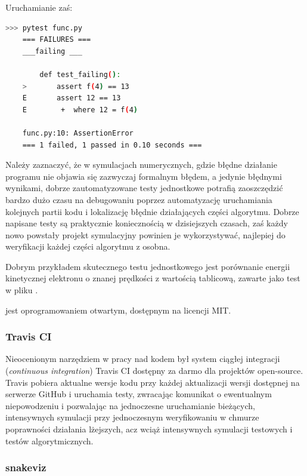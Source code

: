 

Uruchamianie zaś:

\begin{lstlisting}[language=Bash]
    >>> pytest func.py
    === FAILURES ===
    ___failing ___

        def test_failing():
    >       assert f(4) == 13
    E       assert 12 == 13
    E        +  where 12 = f(4)

    func.py:10: AssertionError
    === 1 failed, 1 passed in 0.10 seconds ===
\end{lstlisting}

Należy zaznaczyć, że w symulacjach numerycznych, gdzie błędne działanie programu nie
objawia się zazwyczaj formalnym błędem, a jedynie błędnymi
wynikami, dobrze zautomatyzowane testy jednostkowe potrafią zaoszczędzić
bardzo dużo czasu na debugowaniu poprzez automatyzację uruchamiania
kolejnych partii kodu i lokalizację błędnie działających części algorytmu.
Dobrze napisane testy są praktycznie koniecznością w dzisiejszych czasach,
zaś każdy nowo powstały projekt symulacyjny powinien je
wykorzystywać, najlepiej do weryfikacji każdej części algorytmu z osobna.

Dobrym przykładem skutecznego testu jednostkowego jest porównanie energii kinetycznej
elektronu o znanej prędkości z wartością tablicową, zawarte jako test w pliku
.

 jest oprogramowaniem otwartym, dostępnym na licencji MIT.

\subsubsection{Travis CI}
Nieocenionym narzędziem w pracy nad kodem był system ciągłej integracji
(\emph{continuous integration}) Travis CI \cite{travisci}
dostępny za
darmo dla projektów open-source. Travis pobiera aktualne wersje kodu przy
każdej aktualizacji wersji dostępnej na serwerze GitHub i uruchamia testy,
zwracając komunikat o ewentualnym niepowodzeniu i pozwalając na jednoczesne
uruchamianie bieżących, intensywnych symulacji przy jednoczesnym
weryfikowaniu w chmurze poprawności działania lżejszych, acz wciąż intensywnych
symulacji testowych i testów algorytmicznych.

\subsubsection{snakeviz}

